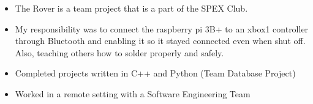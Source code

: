 \documentclass[10pt,a4paper]{altacv}
\begin{document}
%


\begin{itemize}
  \item The Rover is a team project that is a part of the SPEX Club.
  \item My responsibility was to connect the raspberry pi 3B+ to an xbox1 controller through Bluetooth and enabling it so it stayed connected even when shut off. Also, teaching others how to solder properly and safely.
  
\end{itemize}
\bigskip 




  



\smallskip


\begin{itemize}
    \item Completed projects written in C++ and Python (Team Database Project)
    \item Worked in a remote setting with a Software Engineering Team
\end{itemize}
\smallskip
%
\end{document}
